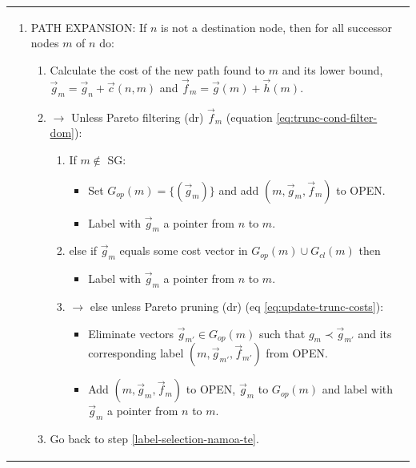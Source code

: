 \begin{table}
{\begin{tabular}{p{\columnwidth}}
\begin{enumerate}
\item PATH EXPANSION: If $n$ is not a destination node, then for all successor nodes $m$ of $n$ do:
  \begin{enumerate}
    \item Calculate the cost of the new path found to $m$ and its lower bound, \newline 
    $\vec g_m = \vec g_n + \vec c(n,m)$ and $\vec f_m = \vec g(m) + \vec h(m)$.
    \item $\rightarrow$ Unless Pareto filtering (dr) $\vec f_m$ (equation \ref{eq:trunc-cond-filter-dom}):
      \begin{enumerate}
      \item If $m \notin$ SG: 
	\begin{itemize}
	\item Set $G_{op}(m)= \{(\vec g_m)\}$ and add $(m, \vec g_m, \vec f_m)$ to OPEN.
	\item Label with $\vec g_m$ a pointer from $n$ to $m$.
	\end{itemize}
      \item else if $\vec g_m$ equals some cost vector in  $G_{op}(m) \cup G_{cl}(m)$ then
	\begin{itemize}
	\item Label with $\vec g_m$ a pointer from $n$ to $m$.
	\end{itemize}
      \item \label{ChapMultiObjAlg:pruning-namoa-te} $\rightarrow$ else unless Pareto pruning (dr) (eq \ref{eq:update-trunc-costs}):  
	\begin{itemize}
   \item Eliminate vectors $\vec g_{m'} \in G_{op}(m)$ such that $g_m \prec \vec g_{m'}$ and its corresponding label $(m, \vec g_{m'}, \vec f_{m'})$ from OPEN.
	\item Add $(m, \vec g_m, \vec f_m)$ to OPEN, $\vec g_m$ to $G_{op}(m)$ and label with $\vec g_m$ a pointer from $n$ to $m$.
	\end{itemize}
      \end{enumerate}
    \item Go back to step \ref{label-selection-namoa-te}.
  \end{enumerate}
\end{enumerate}
\\
\end{tabular}
}
\label{ChapMultiObjAlg:tab:pseudocode-namoa-te} 
\end{table}

